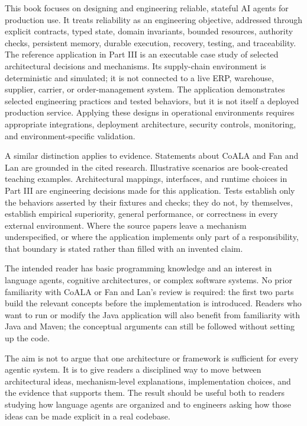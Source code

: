 This book focuses on designing and engineering reliable, stateful AI agents for production use. It treats reliability as an engineering objective, addressed through explicit contracts, typed state, domain invariants, bounded resources, authority checks, persistent memory, durable execution, recovery, testing, and traceability. The reference application in Part III is an executable case study of selected architectural decisions and mechanisms. Its supply-chain environment is deterministic and simulated; it is not connected to a live ERP, warehouse, supplier, carrier, or order-management system. The application demonstrates selected engineering practices and tested behaviors, but it is not itself a deployed production service. Applying these designs in operational environments requires appropriate integrations, deployment architecture, security controls, monitoring, and environment-specific validation.

A similar distinction applies to evidence. Statements about CoALA and Fan and Lan are grounded in the cited research. Illustrative scenarios are book-created teaching examples. Architectural mappings, interfaces, and runtime choices in Part III are engineering decisions made for this application. Tests establish only the behaviors asserted by their fixtures and checks; they do not, by themselves, establish empirical superiority, general performance, or correctness in every external environment. Where the source papers leave a mechanism underspecified, or where the application implements only part of a responsibility, that boundary is stated rather than filled with an invented claim.

The intended reader has basic programming knowledge and an interest in language agents, cognitive architectures, or complex software systems. No prior familiarity with CoALA or Fan and Lan's review is required: the first two parts build the relevant concepts before the implementation is introduced. Readers who want to run or modify the Java application will also benefit from familiarity with Java and Maven; the conceptual arguments can still be followed without setting up the code.

The aim is not to argue that one architecture or framework is sufficient for every agentic system. It is to give readers a disciplined way to move between architectural ideas, mechanism-level explanations, implementation choices, and the evidence that supports them. The result should be useful both to readers studying how language agents are organized and to engineers asking how those ideas can be made explicit in a real codebase.
